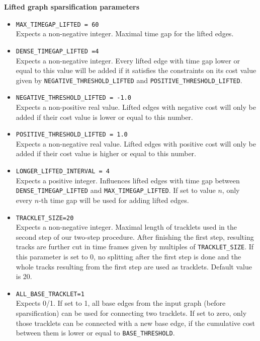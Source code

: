 \documentclass[a4paper,10pt]{article}
\begin{document}
\textbf{Lifted graph sparsification parameters}
 \begin{itemize}
 
  \item  \texttt{MAX\_TIMEGAP\_LIFTED = 60}\\
 Expects a non-negative integer. Maximal time gap for the lifted edges. 
 
 \item  \texttt{DENSE\_TIMEGAP\_LIFTED =4} \\
  Expects a non-negative integer. Every lifted edge with time gap lower or equal to this value will be added if it satisfies the constraints on its cost value given by \texttt{NEGATIVE\_THRESHOLD\_LIFTED} and \texttt{POSITIVE\_THRESHOLD\_LIFTED}.
  
 \item  \texttt{NEGATIVE\_THRESHOLD\_LIFTED = -1.0}\\
 Expects a non-positive real value. Lifted edges with negative cost will only be added if their cost value is lower or equal to this number. 
 
 \item  \texttt{POSITIVE\_THRESHOLD\_LIFTED = 1.0} \\
  Expects a non-negative real value. Lifted edges with positive cost will only be added if their cost value is higher or equal to this number. 
 
 \item  \texttt{LONGER\_LIFTED\_INTERVAL = 4}\\
Expects a positive integer. Influences lifted edges with time gap between \texttt{DENSE\_TIMEGAP\_LIFTED} and \texttt{MAX\_TIMEGAP\_LIFTED}. If set to value $n$, only every $n$-th time gap will be used for adding lifted edges. 

\item \texttt{TRACKLET\_SIZE=20}\\
Expects a non-negative integer. Maximal length of tracklets used in the second step of our two-step procedure. After finishing the first step, resulting tracks are further cut in time frames given by multiples of \texttt{TRACKLET\_SIZE}. If this parameter is set to 0, no splitting after the first step is done and the whole  tracks resulting from the first step are used as tracklets.  Default value is 20.

\item \texttt{ALL\_BASE\_TRACKLET=1}\\
Expects 0/1. If set to 1, all base edges from the input graph (before sparsification) can be used for connecting two tracklets. If set to zero, only those tracklets can be connected with a new base edge, if the cumulative cost between them is lower or equal to \texttt{BASE\_THRESHOLD}.
 

\end{itemize}
\end{document}
